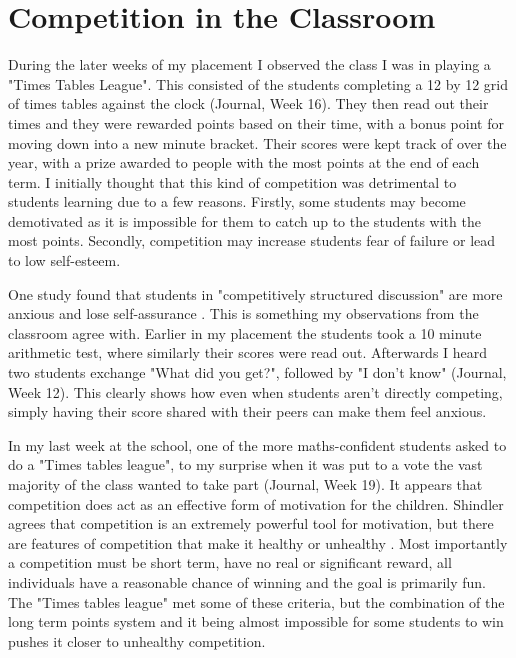 \documentclass[11pt, a4paper, notitlepage]{article}
\begin{document}
\section*{Competition in the Classroom}
During the later weeks of my placement I observed the class I was in playing a "Times Tables League". This consisted of the students completing a 12 by 12 grid of times tables against the clock (Journal, Week 16). They then read out their times and they were rewarded points based on their time, with a bonus point for moving down into a new minute bracket. Their scores were kept track of over the year, with a prize awarded to people with the most points at the end of each term. I initially thought that this kind of competition was  detrimental to students learning due to a few reasons. Firstly, some students may become demotivated as it is impossible for them to catch up to the students with the most points. Secondly, competition may increase students fear of failure or lead to low self-esteem. 
\par
One study found that students in "competitively structured discussion" are more anxious and lose self-assurance \cite{Roger:1973}. This is something my observations from the classroom agree with. Earlier in my placement the students took a 10 minute arithmetic test, where similarly their scores were read out. Afterwards I heard two students exchange "What did you get?", followed by "I don't know" (Journal, Week 12). This clearly shows how even when students aren't directly competing, simply having their score shared with their peers can make them feel anxious. 
\par
In my last week at the school, one of the more maths-confident students asked to do a "Times tables league", to my surprise when it was put to a vote the vast majority of the class wanted to take part (Journal, Week 19). It appears that competition does act as an effective form of motivation for the children. Shindler agrees that competition is an extremely powerful tool for motivation, but there are features of competition that make it healthy or unhealthy \cite{Shindler:2009}. Most importantly a competition must be short term, have no real or significant reward, all individuals have a reasonable chance of winning and the goal is primarily fun. The "Times tables league" met some of these criteria, but the combination of the long term points system and it being almost impossible for some students to win pushes it closer to unhealthy competition. 
\par
\end{document}
